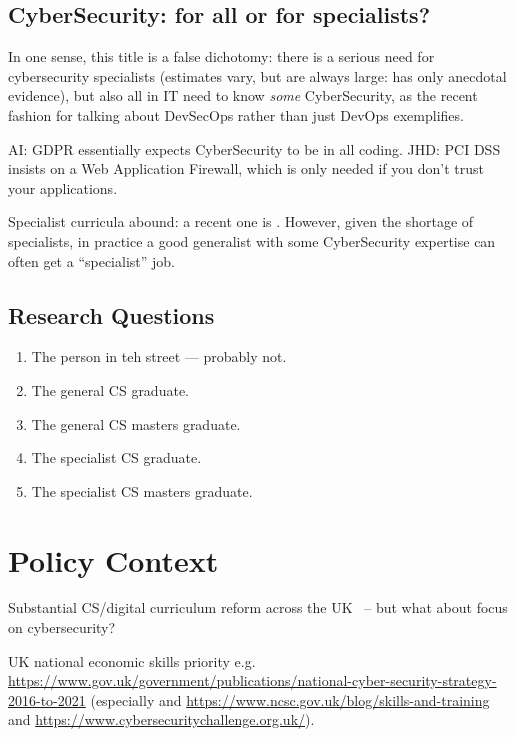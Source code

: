 \documentclass[sigconf]{acmart}
\begin{document}
\subsection{CyberSecurity: for all or for specialists?}
In one sense, this title is a false dichotomy: there is a serious need for cybersecurity specialists (estimates vary, but are always large: \cite{JCNSS2018a} has only anecdotal evidence), but also all in IT need to know \emph{some} CyberSecurity, as the recent fashion for talking about DevSecOps rather than just DevOps exemplifies.

AI: GDPR essentially expects CyberSecurity to be in all coding. 
JHD: PCI DSS insists on a Web Application Firewall, which is only needed if you don't trust your applications.


Specialist curricula abound: a recent one is \cite{ACMIEEEAISSIGSECIFIP}. However, given the shortage of specialists, in practice a good generalist with some CyberSecurity expertise can often get a ``specialist'' job.
\subsection{Research Questions}
\begin{enumerate}
\item The person in teh street --- probably not.
\item The general CS graduate.
\item The general CS masters graduate.
\item The specialist CS graduate.
\item The specialist CS masters graduate.
\end{enumerate}
\section{Policy Context}

Substantial CS/digital curriculum reform across the
UK~\cite{crick+sentance:2011,brown-et-al:sigcse2013,wgictreview:2013,brown-et-al:toce2014,moller+crick:jce2018}
-- but what about focus on cybersecurity?

UK national economic skills priority
e.g. \url{https://www.gov.uk/government/publications/national-cyber-security-strategy-2016-to-2021}
(especially \cite{JCNSS2018a}
and \url{https://www.ncsc.gov.uk/blog/skills-and-training} and
\url{https://www.cybersecuritychallenge.org.uk/}). 
\end{document}

